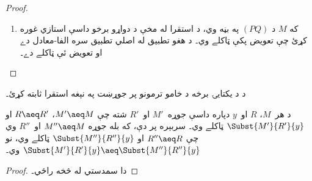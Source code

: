 \documentclass[../../../include/open-logic-section]{subfiles}
\begin{document}
\begin{proof}
\begin{enumerate}
    په عمومي حالت کښې د خام تعويض پر جوړښت استقرا وښيي چې
    هر ټاکلے تعويض د ونې د ثبت له مخې داسې عمل کوي۔ د ټاکلي
    متغير هر ازاد مورد د بديل ترم په يوې نسخې بدلېږي، او نور
    موردونه په خپل ځاے پاتې کېږي۔ په هرې ورګډې شوې نسخې کښې
    تړلي موردونه له خپلو دنننو تړونکو سره تړلي پاتې کېږي؛ د
    تعويض شرطونه د دې نسخې ازاد موردونه له نيول کېدو ساتي۔
    په تطبيق کښې دغه کار په دواړو برخو کښې کېږي، او په
    تجريد کښې د بدن د استقرا پايله کاروو۔ په دې توګه د اصلي
    ترم او د بديل د تړونکو ثبتونه د پايلې ثبت ټاکي۔ الفا-معادل
    استازي يو شان ثبتونه لري؛ نو د ټاکلو تعويضونو پايلې
    الفا-معادل دي۔
    د بېلګې په توګه، که بل~$N''$ او~$R''$ هماغه شرطونه پوره کړي
    او په دې حساب کښې ټول تعويضونه ټاکلي وي، نو لاندې لړۍ لرو۔
    \begin{multline*}
      \Subst{(\lambd[z][\Subst{N''}{z}{x}])}{R''}{y} \\
    \begin{aligned}
      &= \lambd[z][\Subst{\Subst{N''}{z}{x}}{R''}{y}] \\
      &\aeq \lambd[z][\Subst{\Subst{N''}{z}{x}}{R}{y}] && \text{د
        \olref{lem:sub:R} له مخې}\\
      &\aeq\lambd[z][\Subst{\Subst{N'}{z}{x}}{R}{y}]
      && \text{د پورته ثابتې شوې يکتايۍ له مخې}\\
      &=\Subst{(\lambd[z][\Subst{N'}{z}{x}])}{R}{y}
    \end{aligned}
    \end{multline*}
    \item که $M$ د $(PQ)$ په بڼه وي، د استقرا له مخې د دواړو برخو
    داسې استازي غوره کړئ چې تعويض پکې ټاکلے وي۔ د هغو تطبيق
    له اصلي تطبيق سره الفا-معادل دے او تعويض ئې ټاکلے دے۔
  \end{enumerate}
\end{proof}

\begin{prob}
  د  د يکتايۍ برخه د خامو ترمونو
  پر جوړښت په نېغه استقرا ثابته کړئ۔
\end{prob}

\begin{cor}
  د هر~$M$، $R$ او~$y$ دپاره داسې جوړه~$M'$ او~$R'$ شته
  چې $M' \aeq M$، $R \aeq R'$ او $\Subst{M'}{R'}{y}$ ټاکلے
  وي۔ سربېره پر دې، که بله جوړه $M'' \aeq M$ او~$R''$
  وي چې $R'' \aeq R$ او $\Subst{M''}{R''}{y}$ ټاکلے وي، نو
  $\Subst{M'}{R'}{y} \aeq
  \Subst{M''}{R''}{y}$ وي۔
\end{cor}

\begin{proof}
  دا سمدستي له  څخه راځي۔
\end{proof}
\end{document}

